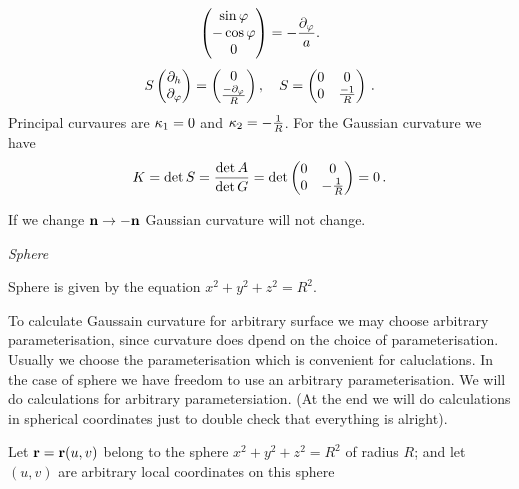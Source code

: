\documentclass[12pt]{article}
\theoremstyle{theorem}
\numberwithin{equation}{section}
\begin{document}
{\begin{equation*}
\begin{pmatrix}
        \sin\varphi \cr
        -\cos\varphi\cr
        0\cr
   \end{pmatrix}=-{\partial_\varphi\over a}.
    \end{equation*}
\begin{equation}\label{weingrartenforcylinder2}
           S
   \begin{pmatrix}
        \partial_h \cr
        \partial_\varphi\cr
   \end{pmatrix}=
   \begin{pmatrix}
         0\cr
        {-\partial_\varphi\over R}\cr
   \end{pmatrix},\quad S=\begin{pmatrix}0&0\cr 0 &{-1\over R}\end{pmatrix}\,.
    \end{equation}
Principal curvaures are ${\kappa}_1=0$ and ${\kappa}_2=-{1\over R}$.
For the Gaussian curvature we have
     \begin{equation}\label{Gaussianforcylinder}
        K=\det S={\det A\over \det G}=\det
                              \begin{pmatrix}0&0\cr
                                0&-{1\over R}\cr
                                   \end{pmatrix}=0\,.
     \end{equation}
   
If we change ${\bf n}\to-{\bf n}$ Gaussian curvature
will not change.





{\it Sphere}


\medskip


  Sphere is given by the equation $x^2+y^2+z^2=R^2$. 

To calculate Gaussain curvature for arbitrary surface we may choose
arbitrary parameterisation, since curvature does
dpend on the choice of parameterisation.  Usually we choose
the parameterisation  which is convenient for caluclations.
In the case of sphere  we have freedom to use  
an arbitrary parameterisation.
We will do calculations for arbitrary parametersiation. 
(At the end we will do calculations in spherical coordinates
just to double check that everything is alright).


Let ${\bf r}={\bf r}(u,v)$ belong to the sphere $x^2+y^2+z^2=R^2$ of radius $R$;
and let 
$(u,v)$ are arbitrary local coordinates on this sphere

}
\end{document}
